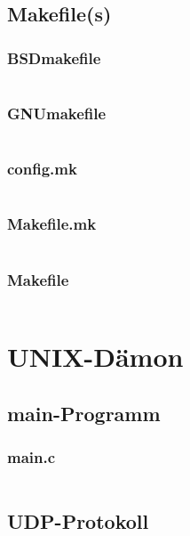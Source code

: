 \begin{landscape}
\begin{multicols}{2}
		\subsection*{Makefile(s)}
		\subsubsection*{BSDmakefile}
		\inputminted[fontsize=\scriptsize,linenos,tabsize=4]{c}{./code/firmware/BSDmakefile}

		\subsubsection*{GNUmakefile}
		\inputminted[fontsize=\scriptsize,linenos,tabsize=4]{c}{./code/firmware/GNUmakefile}

		\subsubsection*{config.mk}
		\inputminted[fontsize=\scriptsize,linenos,tabsize=4]{c}{./code/firmware/config.mk}

		\subsubsection*{Makefile.mk}
		\inputminted[fontsize=\scriptsize,linenos,tabsize=4]{c}{./code/firmware/Makefile.mk}

		\subsubsection*{Makefile}
		\inputminted[fontsize=\scriptsize,linenos,tabsize=4]{c}{./code/firmware/Makefile}

		\newpage
		
		\section{UNIX-Dämon}
		\subsection*{main-Programm}
		\subsubsection*{main.c}
		\inputminted[fontsize=\scriptsize,linenos,tabsize=4]{c}{./code/daemon/src/main.c}

		\subsection*{UDP-Protokoll}

\end{multicols}
\end{landscape}
